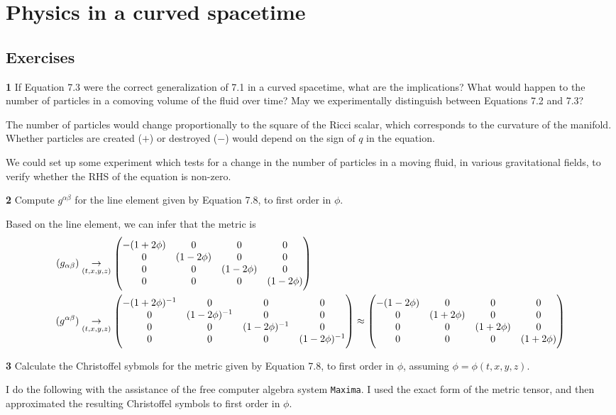 \documentclass[gr-notes.tex]{subfiles}
\begin{document}
\setcounter{chapter}{6}

\chapter{Physics in a curved spacetime}

\setcounter{section}{5}

\section{Exercises}


\textbf{1}
If Equation 7.3 were the correct generalization of 7.1 in a curved spacetime, what are the implications? What would happen to the number of particles in a comoving volume of the fluid over time? May we experimentally distinguish between Equations 7.2 and 7.3?

The number of particles would change proportionally to the square of the Ricci scalar, which corresponds to the curvature of the manifold. Whether particles are created ($+$) or destroyed ($-$) would depend on the sign of $q$ in the equation.

We could set up some experiment which tests for a change in the number of particles in a moving fluid, in various gravitational fields, to verify whether the RHS of the equation is non-zero.




\textbf{2}
Compute $g^{\alpha\beta}$ for the line element given by Equation 7.8, to first order in $\phi$.

Based on the line element, we can infer that the metric is
%
\begin{align*}
  (g_{\alpha\beta}) &\underset{(t,x,y,z)}{\to}
  \mqty(\dmat[0]{-(1+2\phi),(1-2\phi),(1-2\phi),(1-2\phi)})
  \\
  (g^{\alpha\beta}) &\underset{(t,x,y,z)}{\to}
  \mqty(\dmat[0]{-(1+2\phi)^{-1},(1-2\phi)^{-1},(1-2\phi)^{-1},(1-2\phi)^{-1}})
  \approx
  \mqty(\dmat[0]{-(1-2\phi),(1+2\phi),(1+2\phi),(1+2\phi)})
\end{align*}



\textbf{3}
Calculate the Christoffel sybmols for the metric given by Equation 7.8, to first order in $\phi$, assuming $\phi = \phi(t,x,y,z)$.

I do the following with the assistance of the free computer algebra system \texttt{Maxima}. I used the exact form of the metric tensor, and then approximated the resulting Christoffel symbols to first order in $\phi$.
\end{document}
